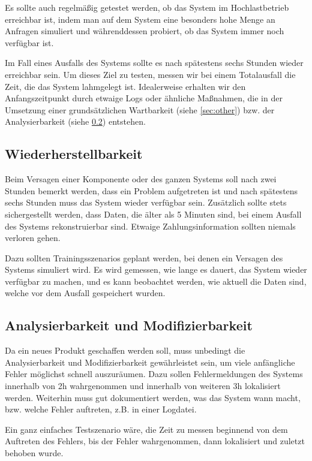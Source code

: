 Es sollte auch regelmäßig getestet werden, ob das System im Hochlastbetrieb erreichbar ist,
indem man auf dem System eine besonders hohe Menge an Anfragen simuliert und währenddessen probiert,
ob das System immer noch verfügbar ist.

Im Fall eines Ausfalls des Systems sollte es nach spätestens sechs Stunden wieder erreichbar sein.
Um dieses Ziel zu testen, messen wir bei einem Totalausfall die Zeit, die das System lahmgelegt ist.
Idealerweise erhalten wir den Anfangszeitpunkt durch etwaige Logs oder ähnliche Maßnahmen,
die in der Umsetzung einer grundsätzlichen Wartbarkeit (siehe \ref{sec:other}) bzw. der Analysierbarkeit (siehe \ref{sec:anal}) entstehen.

\subsection{Wiederherstellbarkeit}
Beim Versagen einer Komponente oder des ganzen Systems soll nach zwei Stunden bemerkt werden,
dass ein Problem aufgetreten ist und nach spätestens sechs Stunden muss das System wieder verfügbar sein.
Zusätzlich sollte stets sichergestellt werden, dass Daten, die älter als 5 Minuten sind, bei einem Ausfall des Systems rekonstruierbar sind.
Etwaige Zahlungsinformation sollten niemals verloren gehen.

Dazu sollten Trainingsszenarios geplant werden, bei denen ein Versagen des Systems simuliert wird.
Es wird gemessen, wie lange es dauert, das System wieder verfügbar zu machen, und es kann beobachtet werden,
wie aktuell die Daten sind, welche vor dem Ausfall gespeichert wurden.


\subsection{Analysierbarkeit und Modifizierbarkeit} \label{sec:anal}
Da ein neues Produkt geschaffen werden soll, muss unbedingt die Analysierbarkeit und Modifizierbarkeit gewährleistet
sein, um viele anfängliche Fehler möglichst schnell auszuräumen.
Dazu sollen Fehlermeldungen des Systems innerhalb von 2h wahrgenommen und innerhalb von weiteren 3h lokalisiert werden.
Weiterhin muss gut dokumentiert werden, was das System wann macht, bzw. welche Fehler auftreten, z.B. in einer Logdatei.

Ein ganz einfaches Testszenario wäre, die Zeit zu messen beginnend von dem Auftreten des Fehlers,
bis der Fehler wahrgenommen, dann lokalisiert und zuletzt behoben wurde.


